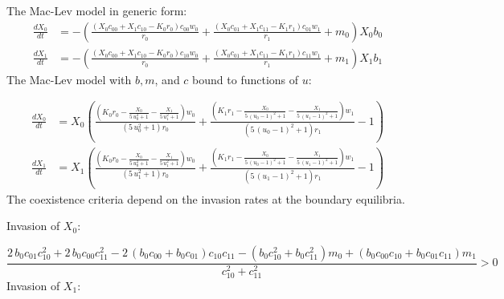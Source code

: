 \documentclass{article}
\begin{document}
The Mac-Lev model in generic form: 
\[\begin{align*}
\frac{dX_{0}}{dt} &= -{\left(\frac{{\left(X_{0} c_{00} + X_{1} c_{10} - K_{0} r_{0}\right)} c_{00} w_{0}}{r_{0}} + \frac{{\left(X_{0} c_{01} + X_{1} c_{11} - K_{1} r_{1}\right)} c_{01} w_{1}}{r_{1}} + m_{0}\right)} X_{0} b_{0}\\
\frac{dX_{1}}{dt} &= -{\left(\frac{{\left(X_{0} c_{00} + X_{1} c_{10} - K_{0} r_{0}\right)} c_{10} w_{0}}{r_{0}} + \frac{{\left(X_{0} c_{01} + X_{1} c_{11} - K_{1} r_{1}\right)} c_{11} w_{1}}{r_{1}} + m_{1}\right)} X_{1} b_{1}
\end{align*} \
\]
The Mac-Lev model with $b, m$, and $c$ bound to functions of $u$:

\[\begin{align*}
\frac{dX_{0}}{dt} &= X_{0} {\left(\frac{{\left(K_{0} r_{0} - \frac{X_{0}}{5 \, u_{0}^{2} + 1} - \frac{X_{1}}{5 \, u_{1}^{2} + 1}\right)} w_{0}}{{\left(5 \, u_{0}^{2} + 1\right)} r_{0}} + \frac{{\left(K_{1} r_{1} - \frac{X_{0}}{5 \, {\left(u_{0} - 1\right)}^{2} + 1} - \frac{X_{1}}{5 \, {\left(u_{1} - 1\right)}^{2} + 1}\right)} w_{1}}{{\left(5 \, {\left(u_{0} - 1\right)}^{2} + 1\right)} r_{1}} - 1\right)}\\
\frac{dX_{1}}{dt} &= X_{1} {\left(\frac{{\left(K_{0} r_{0} - \frac{X_{0}}{5 \, u_{0}^{2} + 1} - \frac{X_{1}}{5 \, u_{1}^{2} + 1}\right)} w_{0}}{{\left(5 \, u_{1}^{2} + 1\right)} r_{0}} + \frac{{\left(K_{1} r_{1} - \frac{X_{0}}{5 \, {\left(u_{0} - 1\right)}^{2} + 1} - \frac{X_{1}}{5 \, {\left(u_{1} - 1\right)}^{2} + 1}\right)} w_{1}}{{\left(5 \, {\left(u_{1} - 1\right)}^{2} + 1\right)} r_{1}} - 1\right)}
\end{align*} \
\]
The coexistence criteria depend on the invasion rates at the boundary equilibria.

Invasion of $X_{0}$:

\[\frac{2 \, b_{0} c_{01} c_{10}^{2} + 2 \, b_{0} c_{00} c_{11}^{2} - 2 \, {\left(b_{0} c_{00} + b_{0} c_{01}\right)} c_{10} c_{11} - {\left(b_{0} c_{10}^{2} + b_{0} c_{11}^{2}\right)} m_{0} + {\left(b_{0} c_{00} c_{10} + b_{0} c_{01} c_{11}\right)} m_{1}}{c_{10}^{2} + c_{11}^{2}} > 0 \
\]
Invasion of $X_{1}$:
\end{document}
